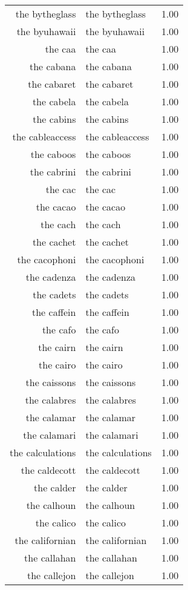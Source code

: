 \begin{table}[ht]
\begin{tabular}{rlr}
  the bytheglass & the bytheglass & 1.00 \\ 
  the byuhawaii & the byuhawaii & 1.00 \\ 
  the caa & the caa & 1.00 \\ 
  the cabana & the cabana & 1.00 \\ 
  the cabaret & the cabaret & 1.00 \\ 
  the cabela & the cabela & 1.00 \\ 
  the cabins & the cabins & 1.00 \\ 
  the cableaccess & the cableaccess & 1.00 \\ 
  the caboos & the caboos & 1.00 \\ 
  the cabrini & the cabrini & 1.00 \\ 
  the cac & the cac & 1.00 \\ 
  the cacao & the cacao & 1.00 \\ 
  the cach & the cach & 1.00 \\ 
  the cachet & the cachet & 1.00 \\ 
  the cacophoni & the cacophoni & 1.00 \\ 
  the cadenza & the cadenza & 1.00 \\ 
  the cadets & the cadets & 1.00 \\ 
  the caffein & the caffein & 1.00 \\ 
  the cafo & the cafo & 1.00 \\ 
  the cairn & the cairn & 1.00 \\ 
  the cairo & the cairo & 1.00 \\ 
  the caissons & the caissons & 1.00 \\ 
  the calabres & the calabres & 1.00 \\ 
  the calamar & the calamar & 1.00 \\ 
  the calamari & the calamari & 1.00 \\ 
  the calculations & the calculations & 1.00 \\ 
  the caldecott & the caldecott & 1.00 \\ 
  the calder & the calder & 1.00 \\ 
  the calhoun & the calhoun & 1.00 \\ 
  the calico & the calico & 1.00 \\ 
  the californian & the californian & 1.00 \\ 
  the callahan & the callahan & 1.00 \\ 
  the callejon & the callejon & 1.00 \\ 

\end{tabular}
\end{table}
